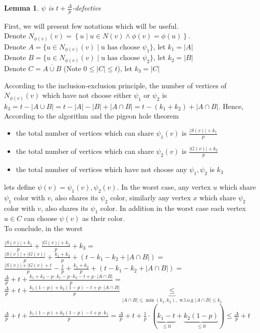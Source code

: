 \documentclass[11pt]{article}
\newtheorem{lemma}[theorem]{Lemma}
\begin{document}
\begin{lemma}
\label{psi_defective_3}
$\psi$ is $t+\frac{\Delta}{p}$-defective
\end{lemma}
First, we will present few notations which will be useful. \\
Denote $N_{\phi(v)}(v)= \left\{ u \mid u \in N(v) \land \phi(v) = \phi(u) \right\}$. \\
Denote $A = \{ u \in N_{\phi(v)}(v) \mid \text{u has choose } \psi_1 \}$, let $k_1 = |A|$ \\
Denote $B = \{ u \in N_{\phi(v)}(v) \mid \text{u has choose } \psi_2 \}$, let $k_2 = |B|$ \\
Denote $C = \overline{A \cup B}$ (Note $0 \le |C| \le t$), let $k_3 = |C| $

According to the inclusion-exclusion principle, the number of vertices of $N_{\phi(v)}(v)$ which have not choose either $\psi_1$ or $\psi_2$ is $k_3 = t - |A \cup B| = t - |A| - |B| + |A \cap B| = t - (k_1 + k_2) + |A \cap B|$.
Hence, According to the algorithm and the pigeon hole theorem
\begin{itemize}
    \item the total number of vertices which can share $\psi_1(v)$ is $\frac{|S(v)| + k_1}{p}$
    \item the total number of vertices which can share $\psi_2(v)$ is $\frac{|G(v)| + k_2}{p}$
    \item the total number of vertices which have not choose any $\psi_1, \psi_2$ is $k_3$
\end{itemize}
lets define $\psi(v) = \psi_1(v), \psi_2(v)$. In the worst case, any vertex $u$ which share $\psi_1$ color with $v$, also shares its $\psi_2$ color, similarly any vertex $x$ which share $\psi_2$ color with $v$, also shares its $\psi_1$ color. In addition in the worst case each vertex $u \in C$ can choose $\psi(v)$ as their color. \\
To conclude, in the worst
\begin{doublespacing}
\newline
$\frac{|S(v)| + k_1}{p} + \frac{|G(v)| + k_2}{p} + k_3 =$
\\[5mm]
$\frac{|S(v)| + |G(v)|}{p} + \frac{k_1 + k_2}{p} + (t - k_1 - k_2 +  |A \cap B|) =$ 
\\[5mm] 
$\frac{|S(v)| + |G(v) +t }{p} - \frac{t}{p} + \frac{k_1 + k_2}{p} + (t - k_1 - k_2 +  |A \cap B|) =$
\\[5mm]
$\frac{\Delta}{p} + t + \frac{k_1 + k_2 - p \cdot k_1 - p \cdot k_2 - t + p  \cdot  |A \cap B|}{p}  = $
\\[5mm]
$\frac{\Delta}{p} + t + \frac{k_1(1-p) + k_2(1-p) - t + p  \cdot  |A \cap B|}{p} \underbrace{\le}_{|A \cap B| \le \min({k_1, k_2}), \text{ w.l.o.g } |A \cap B| \le k_1}$
\\[5mm]  
$\frac{\Delta}{p} + t + \frac{k_1(1-p) + k_2(1-p) - t + p \cdot k_1}{p} =  \frac{\Delta}{p} + t + \frac{1}{p} \cdot (\underbrace{k_1 - t}_{\le 0} + \underbrace{k_2(1-p)}_{\le 0}) \le  \boxed{\frac{\Delta}{p} + t}$
\end{doublespacing}
\end{document}
